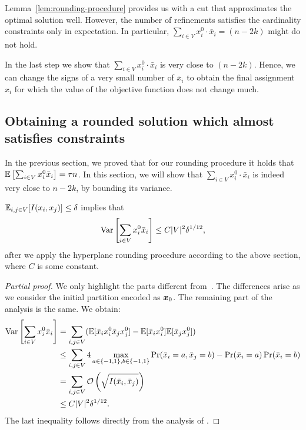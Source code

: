 Lemma~\ref{lem:rounding-procedure} provides us with a cut that approximates the optimal solution well. However, the number of refinements satisfies the cardinality constraints only in expectation. 
In particular, $\sum_{i \in V} x_i^0 \cdot \bar{x}_i = (n-2k)$ might do not hold.

In the last step we show that $\sum_{i \in V} x_i^0 \cdot \bar{x}_i $ is very close to $(n-2k)$. Hence, 
we can change the signs of a very small number of $\bar{x}_i$  to obtain the final assignment $x_i$ for which the value of the objective function does not change much.


\subsection{Obtaining a rounded solution which almost satisfies constraints}
\label{appendix:lasserre:roundingcombined}
In the previous section, we proved that for our rounding procedure it holds that $\mathbb{E}\left[ \sum_{i\in V} x_i^0 \bar{x}_i \right] = \tau n$.
In this section, we will show that $\sum_{i \in V} x_i^0 \cdot \bar{x}_i $ is indeed very close to $n-2k$, by bounding its variance. 

\begin{lemma}
\label{lem:varaince-bound}
    $\operatorname*{\mathbb{E}}_{i,j \in V}[I(x_i, x_j) ] \leq \delta$ implies that 
\begin{equation*}
  \operatorname*{Var}\left[ \sum_{i \in V} x_i^0 \bar{x}_i  \right]	\leq C |V|^2 \delta^{1/12},
\end{equation*}
after we apply the hyperplane rounding procedure according to the above section, where $C$ is some constant. 
\end{lemma}
\begin{proof}[Partial proof]
    We only highlight the parts different from~\citet[Theorem 5.6]{DBLP:conf/soda/RaghavendraT12}.
    The differences arise as we consider the initial partition encoded as $\bm{x}_0$. 
    The remaining part of the analysis is the same.
	We obtain:
    \begin{equation*}
		\begin{split}
	\operatorname*{Var}\left[ \sum_{i \in V} x_i^0 \bar{x}_i  \right]	
	&= \sum_{i, j \in V} (\mathbb{E}[\bar{x}_i x_i^0 \bar{x}_j x_j^0] - \mathbb{E}[\bar{x}_i x_i^0] \mathbb{E}[\bar{x}_j x_j^0]) \\
	&\leq \sum_{i, j \in V} 4 \max_{a \in \{-1,1\}, b \in \{-1, 1\}} \Pr(\bar{x}_i=a, \bar{x}_j = b) - \Pr(\bar{x}_i=a) \Pr(\bar{x}_i=b) \\
	&=\sum_{i, j \in V} \mathcal{O} \left(\sqrt{I(\bar{x}_i, \bar{x}_j)}\right) \\
        &\leq  C |V|^2 \delta^{1/12}.
		\end{split}	
    \end{equation*}
    The last inequality follows directly from the analysis of \citet[Theorem 5.6]{DBLP:conf/soda/RaghavendraT12}.  
\end{proof}

